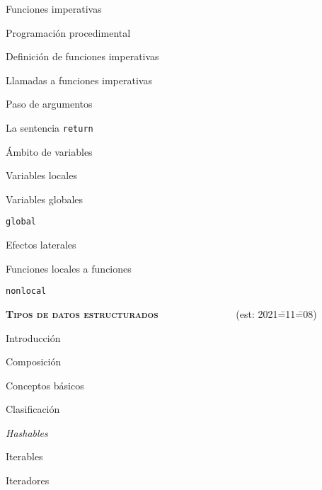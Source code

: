 \begin{longenum}
\begin{longenum}
        \item Funciones imperativas
        \begin{longenum}
            \item Programación procedimental
            \item Definición de funciones imperativas
            \item Llamadas a funciones imperativas
            \item Paso de argumentos
            \item La sentencia \texttt{return}
            \item Ámbito de variables
            \begin{longenum}
                \item Variables locales
                \item Variables globales
                \begin{longenum}
                    \item \texttt{global}
                    \item Efectos laterales
                \end{longenum}
            \end{longenum}
            \item Funciones locales a funciones
            \begin{longenum}
                \item \texttt{nonlocal}
            \end{longenum}
        \end{longenum}
    \end{longenum}
    \item \textbf{\textsc{Tipos de datos estructurados}} \ \ \ \ \ \ \ \ \ \ \ \ \ \ \ (est: 2021\==11\==08)
    \begin{longenum}
        \item Introducción
        \begin{longenum}
            \item Composición
            \item Conceptos básicos
            \item Clasificación
            \item \textit{Hashables}
            \item Iterables
            \item Iteradores
            \begin{longenum}

\end{longenum}
\end{longenum}
\end{longenum}
\end{longenum}
